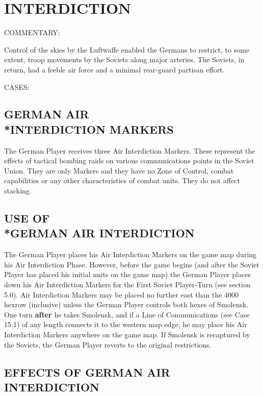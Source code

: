 \clearpage
\section{INTERDICTION}

COMMENTARY:

Control of the skies by the Luftwaffe enabled the Germans to restrict, to some extent, troop movements by the Soviets along major arteries. The Soviets, in return, had a feeble air force and a minimal rear-guard partisan effort.

CASES:

\subsection{GERMAN AIR\\*INTERDICTION MARKERS}

The German Player receives three Air Interdiction Markers. These represent the effects of tactical bombing raids on various communications points in the Soviet Union. They are only Markers and they have no Zone of Control, combat capabilities or any other characteristics of combat units. They do not affect stacking.

\subsection{USE OF\\*GERMAN AIR INTERDICTION}

The German Player places his Air Interdiction Markers on the game map during his Air Interdiction Phase. However, before the game begins (and after the Soviet Player has placed his initial units on the game map) the German Player places down his Air Interdiction Markers for the First Soviet Player-Turn (see section 5.0). Air Interdiction Markers may be placed no further east than the 4000 hexrow (inclusive) unless the German Player controls both hexes of Smolensk. One turn \textbf{after} he takes Smolensk, and if a Line of Communications (see Case 15.1) of any length connects it to the western map edge, he may place his Air Interdiction Markers anywhere on the game map. If Smolensk is recaptured by the Soviets, the German Player reverts to the original restrictions.

\subsection{EFFECTS OF GERMAN AIR INTERDICTION}

